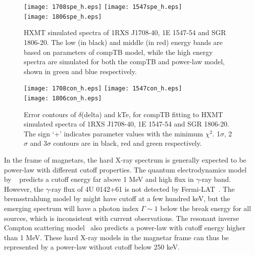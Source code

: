 \documentclass[]{raa}
\begin{document}
\begin{figure}
   \texttt{[image: 1708spe\_h.eps]}
   \texttt{[image: 1547spe\_h.eps]}\\
   \texttt{[image: 1806spe\_h.eps]}

   \caption{HXMT simulated spectra of 1RXS J1708-40, 1E 1547-54 and SGR 1806-20. The low (in black) and middle (in red) energy bands are based on parameters of compTB model, while the high energy spectra are simulated for both the compTB and power-law model, shown in green and blue respectively. } 
   \label{spe_h}
   \end{figure}

\begin{figure}
   \texttt{[image: 1708con\_h.eps]}
   \texttt{[image: 1547con\_h.eps]}\\
   \texttt{[image: 1806con\_h.eps]}

   \caption{Error contours of $\delta$(delta) and kTe, for compTB fitting to HXMT simulated spectra of 1RXS J1708-40, 1E 1547-54 and SGR 1806-20. The sign `+' indicates parameter values with the minimum $\chi^2$. 1$\sigma$, 2$\sigma$ and 3$\sigma$ contours are in black, red and green respectively.} 
   \label{con_h}
   \end{figure}




In the frame of magnetars, the hard X-ray spectrum is generally expected to be power-law with different cutoff properties.
%
The quantum electrodynamics model by ~\citet{Heyl05} predicts a cutoff energy far above 1 MeV and high flux in $\gamma$-ray band.
%
However, the $\gamma$-ray flux of 4U 0142+61 is not detected by Fermi-LAT~\citep{Sasmaz10}.
%
The bremsstrahlung model by \citet{Beloborodov07} might have cutoff at a few hundred keV, but the emerging spectrum will have a photon index $\Gamma \sim 1$ below the break energy for all sources, which is inconsistent with current observations.
%
The resonant inverse Compton scattering model~\citep{Baring07} also predicts a power-law with cutoff energy higher than 1 MeV.
%
%
%
These hard X-ray models in the magnetar frame can thus be represented by a power-law without cutoff below 250 keV.
\end{document}
